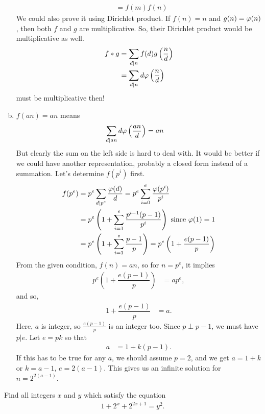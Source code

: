 \documentclass[problems.tex]{subfile}
\begin{document}
\begin{solution}
\begin{enumerate}[(a)]
\begin{align*}
								  & = f(m)f(n)
						\end{align*}
					We could also prove it using Dirichlet product. If $f(n)=n$ and $g(n)=\varphi (n)$, then both $f$ and $g$ are multiplicative. So, their Dirichlet product would be multiplicative as well.
						\begin{align*}
							f\ast g & = \sum_{d|n}f(d)g\left(\dfrac{n}{d}\right)\\
									& = \sum_{d|n}d\varphi \left(\dfrac{n}{d}\right)
						\end{align*}
					must be multiplicative then!
				\item $f(an)=an$ means
						\begin{align*}
							\sum_{d|an}d\varphi \left(\dfrac{an}{d}\right) & = an
						\end{align*}
					But clearly the sum on the left side is hard to deal with. It would be better if we could have another representation, probably a closed form instead of a summation. Let's determine $f(p^i)$ first.
						\begin{align*}
							f(p^e)  & = p^e\sum_{d|p^e}\dfrac{\varphi (d)}{d} = p^e\sum_{i=0}^{e}\dfrac{\varphi (p^i)}{p^i}\\
									& = p^e\left(1+\sum_{i=1}^{e}\dfrac{p^{i-1}(p-1)}{p^i}\right)\text { since }\varphi (1)=1\\
									& = p^e\left(1+\sum_{i=1}^{e}\dfrac{p-1}{p}\right)= p^e\left(1+\dfrac{e(p-1)}{p}\right)
						\end{align*}
					From the given condition, $f(n) = an$, so for $n=p^e$, it implies
						\begin{align*}
							p^e\left(1+\dfrac{e(p-1)}{p}\right) & = ap^e,
						\end{align*}
					and so,
						\begin{align*}
							1+\dfrac{e(p-1)}{p} & = a.
						\end{align*}
					Here, $a$ is integer, so $\frac{e(p-1)}{p}$ is an integer too. Since $p\perp p-1$, we must have $p|e$. Let $e=pk$ so that
						\begin{align*}
							a & = 1+k(p-1).
						\end{align*}
					If this has to be true for any $a$, we should assume $p=2$, and we get $a=1+k$ or $k=a-1$, $e=2(a-1)$. This gives us an infinite solution for $n=2^{2(a-1)}$.
			\end{enumerate}
	\end{solution}
	
	\begin{problem}[IMO 2006]
		Find all integers $x$ and $y$ which satisfy the equation
		\begin{align*}
		1 + 2^x + 2^{2x + 1} = y^2.
		\end{align*}
	\end{problem}
	
\end{document}
